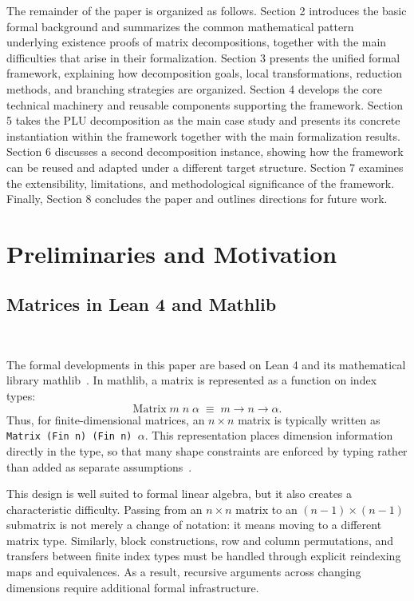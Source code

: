 \documentclass[pdflatex,sn-mathphys-num]{sn-jnl}%
\theoremstyle{thmstyleone}%
\theoremstyle{thmstyletwo}%
\theoremstyle{thmstylethree}%
\begin{document}
The remainder of the paper is organized as follows. Section 2 introduces the basic formal background and summarizes the common mathematical pattern underlying existence proofs of matrix decompositions, together with the main difficulties that arise in their formalization. Section 3 presents the unified formal framework, explaining how decomposition goals, local transformations, reduction methods, and branching strategies are organized. Section 4 develops the core technical machinery and reusable components supporting the framework. Section 5 takes the PLU decomposition as the main case study and presents its concrete instantiation within the framework together with the main formalization results. Section 6 discusses a second decomposition instance, showing how the framework can be reused and adapted under a different target structure. Section 7 examines the extensibility, limitations, and methodological significance of the framework. Finally, Section 8 concludes the paper and outlines directions for future work.

\section{Preliminaries and Motivation}
\label{sec:preliminaries}
\subsection{Matrices in Lean 4 and Mathlib}
\

The formal developments in this paper are based on Lean 4 and its mathematical library mathlib~\cite{mathlib2020,moura2021lean}. In mathlib, a matrix is represented as a function on index types:
\[
\mathrm{Matrix}\; m\; n\; \alpha \;\equiv\; m \to n \to \alpha .
\]
Thus, for finite-dimensional matrices, an $n \times n$ matrix is typically written as \texttt{Matrix (Fin n) (Fin n) $\alpha$}. This representation places dimension information directly in the type, so that many shape constraints are enforced by typing rather than added as separate assumptions~\cite{mathlib2020,avigad2020mathematics}.

This design is well suited to formal linear algebra, but it also creates a characteristic difficulty. Passing from an $n \times n$ matrix to an $(n-1) \times (n-1)$ submatrix is not merely a change of notation: it means moving to a different matrix type. Similarly, block constructions, row and column permutations, and transfers between finite index types must be handled through explicit reindexing maps and equivalences. As a result, recursive arguments across changing dimensions require additional formal infrastructure.
\end{document}
